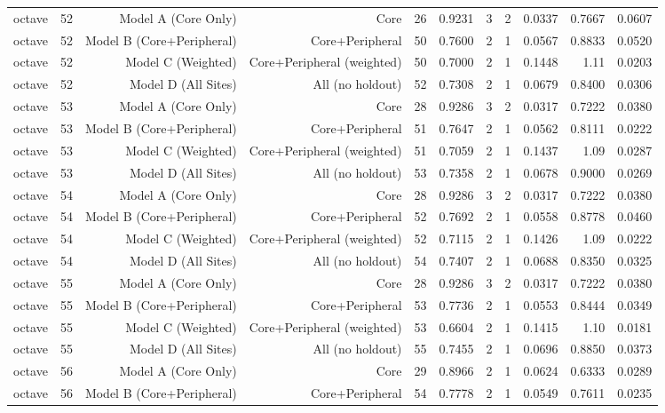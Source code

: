 {\begin{longtable}{lrrrrrrrrrr}
  octave & 52 & Model A (Core Only) & Core & 26 & 0.9231 & 3 & 2 & 0.0337 & 0.7667 & 0.0607 \\
  octave & 52 & Model B (Core+Peripheral) & Core+Peripheral & 50 & 0.7600 & 2 & 1 & 0.0567 & 0.8833 & 0.0520 \\
  octave & 52 & Model C (Weighted) & Core+Peripheral (weighted) & 50 & 0.7000 & 2 & 1 & 0.1448 & 1.11 & 0.0203 \\
  octave & 52 & Model D (All Sites) & All (no holdout) & 52 & 0.7308 & 2 & 1 & 0.0679 & 0.8400 & 0.0306 \\
  octave & 53 & Model A (Core Only) & Core & 28 & 0.9286 & 3 & 2 & 0.0317 & 0.7222 & 0.0380 \\
  octave & 53 & Model B (Core+Peripheral) & Core+Peripheral & 51 & 0.7647 & 2 & 1 & 0.0562 & 0.8111 & 0.0222 \\
  octave & 53 & Model C (Weighted) & Core+Peripheral (weighted) & 51 & 0.7059 & 2 & 1 & 0.1437 & 1.09 & 0.0287 \\
  octave & 53 & Model D (All Sites) & All (no holdout) & 53 & 0.7358 & 2 & 1 & 0.0678 & 0.9000 & 0.0269 \\
  octave & 54 & Model A (Core Only) & Core & 28 & 0.9286 & 3 & 2 & 0.0317 & 0.7222 & 0.0380 \\
  octave & 54 & Model B (Core+Peripheral) & Core+Peripheral & 52 & 0.7692 & 2 & 1 & 0.0558 & 0.8778 & 0.0460 \\
  octave & 54 & Model C (Weighted) & Core+Peripheral (weighted) & 52 & 0.7115 & 2 & 1 & 0.1426 & 1.09 & 0.0222 \\
  octave & 54 & Model D (All Sites) & All (no holdout) & 54 & 0.7407 & 2 & 1 & 0.0688 & 0.8350 & 0.0325 \\
  octave & 55 & Model A (Core Only) & Core & 28 & 0.9286 & 3 & 2 & 0.0317 & 0.7222 & 0.0380 \\
  octave & 55 & Model B (Core+Peripheral) & Core+Peripheral & 53 & 0.7736 & 2 & 1 & 0.0553 & 0.8444 & 0.0349 \\
  octave & 55 & Model C (Weighted) & Core+Peripheral (weighted) & 53 & 0.6604 & 2 & 1 & 0.1415 & 1.10 & 0.0181 \\
  octave & 55 & Model D (All Sites) & All (no holdout) & 55 & 0.7455 & 2 & 1 & 0.0696 & 0.8850 & 0.0373 \\
  octave & 56 & Model A (Core Only) & Core & 29 & 0.8966 & 2 & 1 & 0.0624 & 0.6333 & 0.0289 \\
  octave & 56 & Model B (Core+Peripheral) & Core+Peripheral & 54 & 0.7778 & 2 & 1 & 0.0549 & 0.7611 & 0.0235 \\

\end{longtable}}
